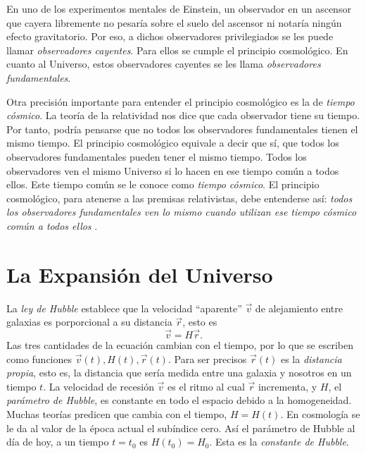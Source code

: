 \documentclass[a4paper,openright,12pt]{book}
\begin{document}
En uno de los experimentos mentales de Einstein, un observador en un ascensor que cayera libremente no pesaría sobre el suelo del ascensor ni notaría ningún efecto gravitatorio. Por eso, a dichos observadores privilegiados se les puede llamar \textit{observadores cayentes}. Para ellos se cumple el principio cosmológico. En cuanto al Universo, estos observadores cayentes se les llama \textit{observadores fundamentales}.

Otra precisión importante para entender el principio cosmológico es la de \textit{tiempo cósmico}. La teoría de la relatividad nos dice que cada observador tiene su tiempo. Por tanto, podría pensarse que no todos los observadores fundamentales tienen el mismo tiempo. El principio cosmológico equivale a decir que sí, que todos los observadores fundamentales pueden tener el mismo tiempo. Todos los observadores ven el mismo Universo si lo hacen en ese tiempo común a todos ellos. Este tiempo común se le conoce como \textit{tiempo cósmico}. El principio cosmológico, para atenerse a las premisas relativistas, debe entenderse así: \textit{todos los observadores fundamentales ven lo mismo cuando utilizan ese tiempo cósmico común a todos ellos} \cite{1.02}.


\section{La Expansión del Universo}
La \textit{ley de Hubble} \cite{1.1} establece que la velocidad ``aparente'' $\vec{v}$ de alejamiento entre galaxias es porporcional a su distancia $\vec{r}$, esto es
\begin{equation}
\vec{v} = H\vec{r}.\label{eqn 1.1}
\end{equation}
Las tres cantidades de la ecuación cambian con el tiempo, por lo que se escriben como funciones $\vec{v}(t), H(t), \vec{r}(t)$. Para ser precisos $\vec{r}(t)$ es la \textit{distancia propia}, esto es, la distancia que sería medida entre una galaxia y nosotros en un tiempo $t$. La velocidad de recesión $\vec{v}$ es el ritmo al cual $\vec{r}$ incrementa, y $H$, el \textit{parámetro de Hubble}, es constante en todo el espacio debido a la homogeneidad. Muchas teorías predicen que cambia con el tiempo, $H = H(t)$. En cosmología se le da al valor de la época actual el subíndice cero. Así el parámetro de Hubble al día de hoy, a un tiempo $t= t_{0}$ es $H(t_{0})= H_{0}$. Esta es la \textit{constante de Hubble}.
\end{document}

